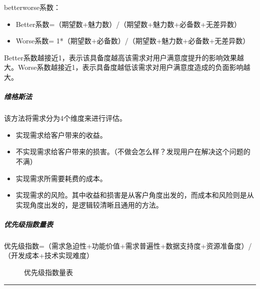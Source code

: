\documentclass[letterpaper,11pt,english]{sphinxmanual}
\begin{document}
better\sphinxhyphen{}worse系数：
\begin{itemize}
\item {} 
Better系数=（期望数+魅力数）/（期望数+魅力数+必备数+无差异数）

\item {} 
Worse系数= \sphinxhyphen{}1*（期望数+必备数）/（期望数+魅力数+必备数+无差异数）

\end{itemize}

Better系数越接近1，表示该具备度越高该需求对用户满意度提升的影响效果越大。Worse系数越接近\sphinxhyphen{}1，表示具备度越低该需求对用户满意度造成的负面影响越大。



\subparagraph{维格斯法}
\label{\detokenize{chapter_skill/upgrade_manage:id12}}
该方法将需求分为4个维度来进行评估。
\begin{itemize}
\item {} 
实现需求给客户带来的收益。

\item {} 
不实现需求给客户带来的损害。（不做会怎么样？发现用户在解决这个问题的不满）

\item {} 
实现需求所需要耗费的成本。

\item {} 
实现需求的风险。其中收益和损害是从客户角度出发的，而成本和风险则是从实现角度出发的，是逻辑较清晰且通用的方法。

\end{itemize}


\subparagraph{优先级指数量表}
\label{\detokenize{chapter_skill/upgrade_manage:id13}}
优先级指数=（需求急迫性+功能价值+需求普遍性+数据支持度+资源准备度）/（开发成本+技术实现难度）

\begin{figure}[H]
\centering
\capstart

\noindent{}
\caption{优先级指数量表}\label{\detokenize{chapter_skill/upgrade_manage:id17}}\end{figure}


\bigskip\hrule\bigskip
\end{document}
